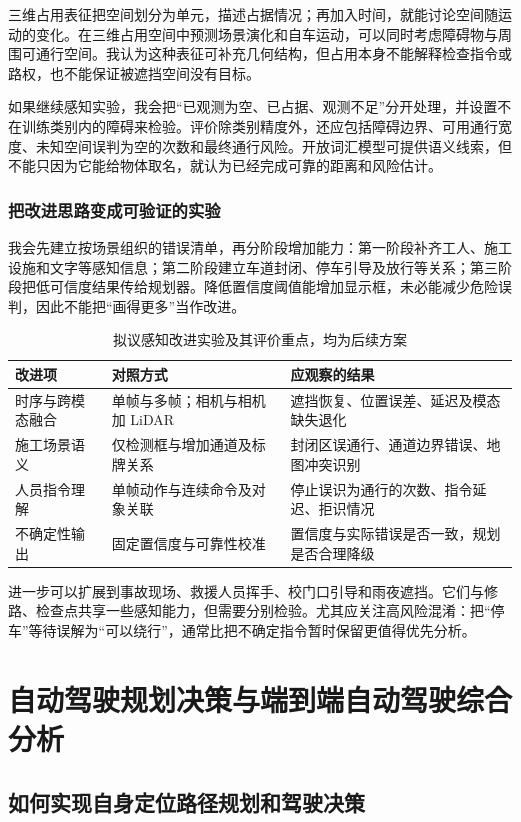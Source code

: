 \documentclass[UTF8,zihao=-4,fontset=windows]{ctexart}
\begin{document}
三维占用表征把空间划分为单元，描述占据情况；再加入时间，就能讨论空间随运动的变化。在三维占用空间中预测场景演化和自车运动，可以同时考虑障碍物与周围可通行空间。我认为这种表征可补充几何结构，但占用本身不能解释检查指令或路权，也不能保证被遮挡空间没有目标。

如果继续感知实验，我会把“已观测为空、已占据、观测不足”分开处理，并设置不在训练类别内的障碍来检验。评价除类别精度外，还应包括障碍边界、可用通行宽度、未知空间误判为空的次数和最终通行风险。开放词汇模型可提供语义线索，但不能只因为它能给物体取名，就认为已经完成可靠的距离和风险估计。

\subsubsection{把改进思路变成可验证的实验}
我会先建立按场景组织的错误清单，再分阶段增加能力：第一阶段补齐工人、施工设施和文字等感知信息；第二阶段建立车道封闭、停车引导及放行等关系；第三阶段把低可信度结果传给规划器。降低置信度阈值能增加显示框，未必能减少危险误判，因此不能把“画得更多”当作改进。
\begin{table}[H]\centering\small\caption{拟议感知改进实验及其评价重点，均为后续方案}
\begin{tabularx}{\textwidth}{p{2.3cm}XX}\toprule
改进项 & 对照方式 & 应观察的结果\\\midrule
时序与跨模态融合 & 单帧与多帧；相机与相机加 LiDAR & 遮挡恢复、位置误差、延迟及模态缺失退化\\
施工场景语义 & 仅检测框与增加通道及标牌关系 & 封闭区误通行、通道边界错误、地图冲突识别\\
人员指令理解 & 单帧动作与连续命令及对象关联 & 停止误识为通行的次数、指令延迟、拒识情况\\
不确定性输出 & 固定置信度与可靠性校准 & 置信度与实际错误是否一致，规划是否合理降级\\\bottomrule\end{tabularx}\end{table}
进一步可以扩展到事故现场、救援人员挥手、校门口引导和雨夜遮挡。它们与修路、检查点共享一些感知能力，但需要分别检验。尤其应关注高风险混淆：把“停车”等待误解为“可以绕行”，通常比把不确定指令暂时保留更值得优先分析。

\section{自动驾驶规划决策与端到端自动驾驶综合分析}
\FloatBarrier
\subsection{如何实现自身定位路径规划和驾驶决策}
\end{document}

